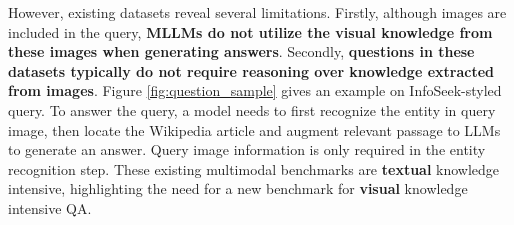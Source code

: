 However, existing datasets reveal several limitations. Firstly, although images are included in the query, \textbf{MLLMs do not utilize the visual knowledge from these images when generating answers}. Secondly, \textbf{questions in these datasets typically do not require reasoning over knowledge extracted from images}. Figure \ref{fig:question_sample} gives an example on InfoSeek-styled query. To answer the query, a model needs to first recognize the entity in query image, then locate the Wikipedia article and augment relevant passage to LLMs to generate an answer. Query image information is only required in the entity recognition step. %
These existing multimodal benchmarks are \textbf{textual} knowledge intensive, highlighting the need for a new benchmark for \textbf{visual} knowledge intensive QA.


